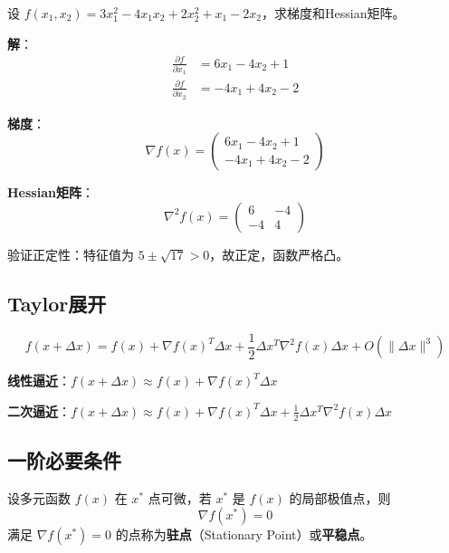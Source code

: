 \begin{example}[计算梯度和Hessian矩阵]
设 $f(x_1, x_2) = 3x_1^2 - 4x_1x_2 + 2x_2^2 + x_1 - 2x_2$，求梯度和Hessian矩阵。

\textbf{解}：
\begin{align*}
\frac{\partial f}{\partial x_1} &= 6x_1 - 4x_2 + 1 \\
\frac{\partial f}{\partial x_2} &= -4x_1 + 4x_2 - 2
\end{align*}

\textbf{梯度}：
\[
\nabla f(x) = \begin{pmatrix} 6x_1 - 4x_2 + 1 \\ -4x_1 + 4x_2 - 2 \end{pmatrix}
\]

\textbf{Hessian矩阵}：
\[
\nabla^2 f(x) = \begin{pmatrix} 6 & -4 \\ -4 & 4 \end{pmatrix}
\]

验证正定性：特征值为 $5 \pm \sqrt{17} > 0$，故正定，函数严格凸。
\end{example}

\subsection{Taylor展开}\label{sec:taylor}

\begin{property}[多元函数的Taylor展开]
\[
f(x + \Delta x) = f(x) + \nabla f(x)^T \Delta x + \frac{1}{2} \Delta x^T \nabla^2 f(x) \Delta x + O(\|\Delta x\|^3)
\]

\textbf{线性逼近}：$f(x + \Delta x) \approx f(x) + \nabla f(x)^T \Delta x$

\textbf{二次逼近}：$f(x + \Delta x) \approx f(x) + \nabla f(x)^T \Delta x + \frac{1}{2} \Delta x^T \nabla^2 f(x) \Delta x$
\end{property}

\subsection{一阶必要条件}

\begin{theorem}[一阶必要条件]\label{thm:first-order}
设多元函数 $f(x)$ 在 $x^*$ 点可微，若 $x^*$ 是 $f(x)$ 的局部极值点，则
\[
\nabla f(x^*) = 0
\]
满足 $\nabla f(x^*) = 0$ 的点称为\textbf{驻点}（Stationary Point）或\textbf{平稳点}。
\end{theorem}

